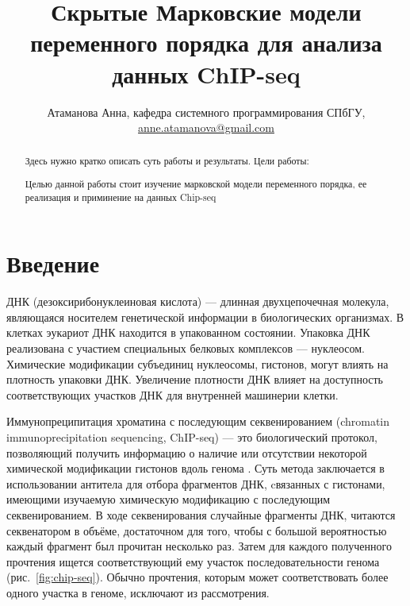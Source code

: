 \documentclass[10pt,a4paper]{article}
\begin{document}
\title{Скрытые Марковские модели переменного порядка для анализа данных
  ChIP-seq}
\author{Атаманова Анна, кафедра системного программирования СПбГУ, \url{anne.atamanova@gmail.com}}

\maketitle

\begin{abstract}
  Здесь нужно кратко описать суть работы и результаты.
  Цели работы:  
  
\makeatletter
\makeatother
{}
\renewcommand{\labelitemi}{-}
\renewcommand{\labelenumi}{\asbuk{enumi})}
\renewcommand{\labelenumii}{\arabic{enumii})}
Целью данной работы стоит изучение марковской модели переменного порядка, ее реализация и приминение на данных Chip-seq

\end{abstract}

\section{Введение}

ДНК (дезоксирибонуклеиновая кислота) --- длинная двухцепочечная молекула, являющаяся носителем
генетической информации в биологических организмах. В клетках эукариот ДНК
находится в упакованном состоянии. Упаковка ДНК реализована с участием
специальных белковых комплексов --- нуклеосом. Химические модификации субъединиц
нуклеосомы, гистонов, могут влиять на плотность упаковки ДНК. Увеличение
плотности ДНК влияет на доступность соответствующих участков ДНК для внутренней
машинерии клетки.


Иммунопреципитация хроматина с последующим секвенированием (chromatin
immunoprecipitation sequencing, ChIP-seq) --- это биологический протокол,
позволяющий получить информацию о наличие или отсутствии некоторой химической
модификации гистонов вдоль генома \cite{Johnson2007}. Суть метода заключается в
использовании антитела для отбора фрагментов ДНК, cвязанных с гистонами,
имеющими изучаемую химическую модификацию с последующим секвенированием. В ходе
секвенирования случайные фрагменты ДНК, читаются секвенатором в объёме,
достаточном для того, чтобы с большой вероятностью каждый фрагмент был прочитан
несколько раз. Затем для каждого полученного прочтения ищется соответствующий
ему участок последовательности генома (рис.~\ref{fig:chip-seq}). Обычно
прочтения, которым может соответствовать более одного участка в геноме,
исключают из рассмотрения.
\end{document}
